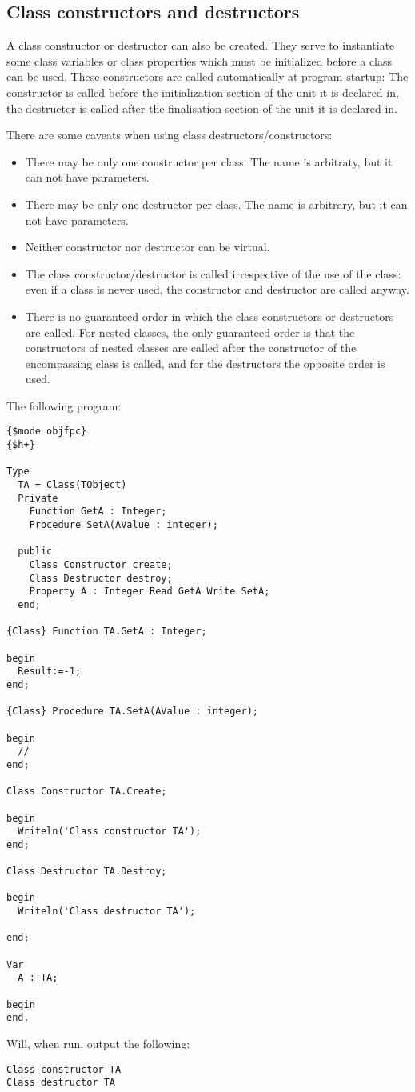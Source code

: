 \subsection{Class constructors and destructors}
A class constructor or destructor can also be created. They serve to instantiate some class variables or class properties which must be initialized before a class can be used.
These constructors are called automatically at program startup: The constructor is called before the initialization section of the unit it is declared in, the destructor is 
called after the finalisation section of the unit it is declared in. 

There are some caveats when using class destructors/constructors:
\begin{itemize}
\item There may be only one constructor per class. The name is arbitraty, but it can not have parameters.
\item There may be only one destructor per class. The name is arbitrary, but it can not have parameters.
\item Neither constructor nor destructor can be virtual.
\item The class constructor/destructor is called irrespective of the use of the class: even if a class is never used, the constructor and destructor are called anyway.
\item There is no guaranteed order in which the class constructors or destructors are called. 
For nested classes, the only guaranteed order is that the constructors of
nested classes are called after the constructor of the encompassing class is
called, and for the destructors the opposite order is used.
\end{itemize}
 
The following program:

\begin{verbatim}
{$mode objfpc}
{$h+}

Type
  TA = Class(TObject)
  Private
    Function GetA : Integer;
    Procedure SetA(AValue : integer);

  public
    Class Constructor create;
    Class Destructor destroy;
    Property A : Integer Read GetA Write SetA;
  end;

{Class} Function TA.GetA : Integer;

begin
  Result:=-1;
end;

{Class} Procedure TA.SetA(AValue : integer);

begin
  // 
end;

Class Constructor TA.Create;

begin
  Writeln('Class constructor TA');
end;

Class Destructor TA.Destroy;

begin
  Writeln('Class destructor TA');

end;

Var
  A : TA;

begin
end.
\end{verbatim}
Will, when run, output the following:
\begin{verbatim}
Class constructor TA
Class destructor TA
\end{verbatim}


